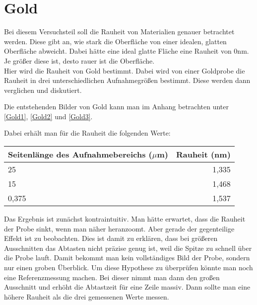 \section{Gold}

Bei diesem Versuchsteil soll die Rauheit von Materialien genauer betrachtet werden. Diese gibt an, wie stark die Oberfläche von einer idealen, glatten Oberfläche abweicht. 
Dabei hätte eine ideal glatte Fläche eine Rauheit von 0nm. Je größer diese ist, desto rauer ist die Oberfläche.\\

Hier wird die Rauheit von Gold bestimmt. Dabei wird von einer Goldprobe die Rauheit in drei unterschiedlichen 
Aufnahmegrößen bestimmt. Diese werden dann verglichen und diskutiert.

Die entstehenden Bilder von Gold kann man im Anhang betrachten unter \ref{Gold1}, \ref{Gold2} und \ref{Gold3}.

Dabei erhält man für die Rauheit die folgenden Werte:\\
\begin{center}
    \centering
    \begin{tabular}{lr}
        \toprule
        Seitenlänge des Aufnahmebereichs ($\mu$m) & Rauheit (nm)\\
        \midrule
        25 & 1,335\\
        15 & 1,468 \\
        0,375 & 1,537\\
    \end{tabular}
\end{center}

Das Ergebnis ist zunächst kontraintuitiv. Man hätte erwartet, dass die Rauheit der Probe sinkt, 
wenn man näher heranzoomt. Aber gerade der gegenteilige Effekt ist zu beobachten. Dies ist damit zu erklären, 
dass bei größeren Ausschnitten das Abtasten nicht präzise genug ist, weil 
die Spitze zu schnell über die Probe lauft. Damit bekommt man kein vollständiges Bild der Probe, sondern nur einen groben Überblick. 
Um diese Hypothese zu überprüfen könnte man noch eine Referenzmessung machen. Bei dieser nimmt man dann den großen Ausschnitt und 
erhöht die Abtastzeit für eine Zeile massiv. Dann sollte man eine höhere Rauheit als die 
drei gemessenen Werte messen.
